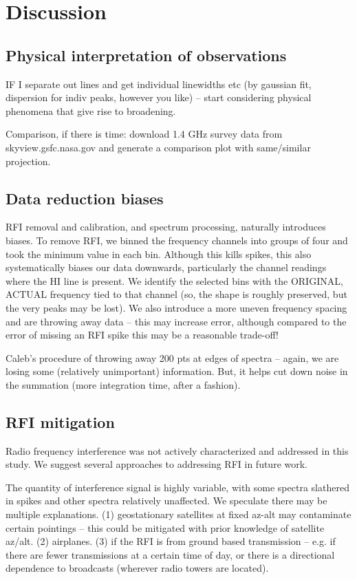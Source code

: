 \documentclass[10pt]{article}
\begin{document}
\section{Discussion}

\subsection{Physical interpretation of observations}

IF I separate out lines and get individual linewidths etc (by gaussian fit, dispersion for indiv peaks, however you like) -- start considering physical phenomena that give rise to broadening.

Comparison, if there is time: download 1.4 GHz survey data from skyview.gsfc.nasa.gov and generate a comparison plot with same/similar projection.

\subsection{Data reduction biases}

RFI removal and calibration, and spectrum processing, naturally introduces biases.  To remove RFI, we binned the frequency channels into groups of four and took the minimum value in each bin.  Although this kills spikes, this also systematically biases our data downwards, particularly the channel readings where the HI line is present.  We identify the selected bins with the ORIGINAL, ACTUAL frequency tied to that channel (so, the shape is roughly preserved, but the very peaks may be lost).  We also introduce a more uneven frequency spacing and are throwing away data -- this may increase error, although compared to the error of missing an RFI spike this may be a reasonable trade-off!

Caleb's procedure of throwing away 200 pts at edges of spectra -- again, we are losing some (relatively unimportant) information.  But, it helps cut down noise in the summation (more integration time, after a fashion).

\subsection{RFI mitigation}

Radio frequency interference was not actively characterized and addressed in this study.  We suggest several approaches to addressing RFI in future work.

The quantity of interference signal is highly variable, with some spectra slathered in spikes and other spectra relatively unaffected.  We speculate there may be multiple explanations.  (1) geostationary satellites at fixed az-alt may contaminate certain pointings -- this could be mitigated with prior knowledge of satellite az/alt. (2) airplanes.  (3) if the RFI is from ground based transmission -- e.g. if there are fewer transmissions at a certain time of day, or there is a directional dependence to broadcasts (wherever radio towers are located).
\end{document}
